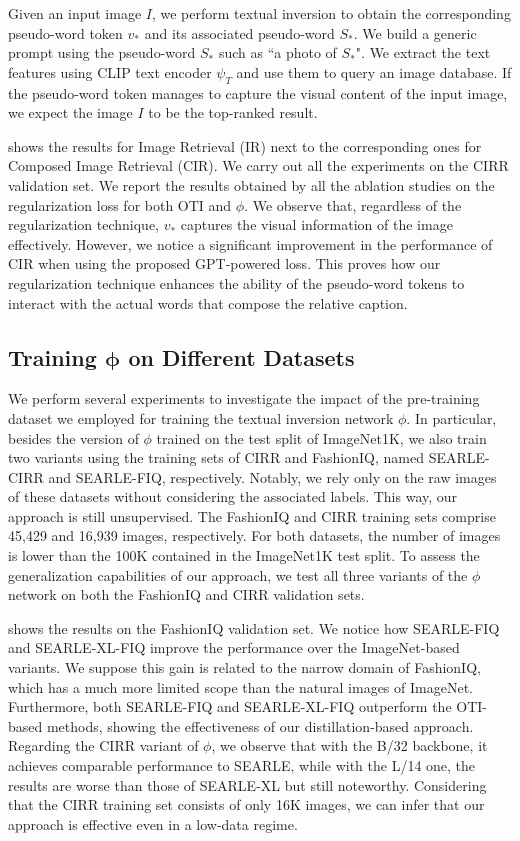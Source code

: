\documentclass[10pt,twocolumn,letterpaper]{article}
\newcommand{\method}{SEARLE\xspace}
\DeclareRobustCommand{\vect}[1]{\bm{#1}}
\begin{document}
Given an input image $I$, we perform textual inversion to obtain the corresponding pseudo-word token $v_*$ and its associated pseudo-word $S_*$. We build a generic prompt using the pseudo-word $S_*$ such as ``a photo of $S_*$". We extract the text features using CLIP text encoder $\psi_{T}$ and use them to query an image database. If the pseudo-word token manages to capture the visual content of the input image, we expect the image $I$ to be the top-ranked result.

 shows the results for Image Retrieval (IR) next to the corresponding ones for Composed Image Retrieval (CIR). We carry out all the experiments on the CIRR validation set. We report the results obtained by all the ablation studies on the regularization loss for both OTI and $\phi$. We observe that, regardless of the regularization technique, $v_*$ captures the visual information of the image effectively. However, we notice a significant improvement in the performance of CIR when using the proposed GPT-powered loss. This proves how our regularization technique enhances the ability of the pseudo-word tokens to interact with the actual words that compose the relative caption.


\subsection{Training $\vect{\phi}$ on Different Datasets}
We perform several experiments to investigate the impact of the pre-training dataset we employed for training the textual inversion network $\phi$. In particular, besides the version of $\phi$ trained on the test split of ImageNet1K, we also train two variants using the training sets of CIRR and FashionIQ, named \method-CIRR and \method-FIQ, respectively. Notably, we rely only on the raw images of these datasets without considering the associated labels. This way, our approach is still unsupervised. The FashionIQ and CIRR training sets comprise 45,429 and 16,939 images, respectively. For both datasets, the number of images is lower than the 100K contained in the ImageNet1K test split. To assess the generalization capabilities of our approach, we test all three variants of the $\phi$ network on both the FashionIQ and CIRR validation sets. 

 shows the results on the FashionIQ validation set. We notice how \method-FIQ and \method-XL-FIQ improve the performance over the ImageNet-based variants. We suppose this gain is related to the narrow domain of FashionIQ, which has a much more limited scope than the natural images of ImageNet. Furthermore, both \method-FIQ and \method-XL-FIQ outperform the OTI-based methods, showing the effectiveness of our distillation-based approach. 
Regarding the CIRR variant of $\phi$, we observe that with the B/32 backbone, it achieves comparable performance to \method, while with the L/14 one, the results are worse than those of \method-XL but still noteworthy. Considering that the CIRR training set consists of only 16K images, we can infer that our approach is effective even in a low-data regime. 
\end{document}
